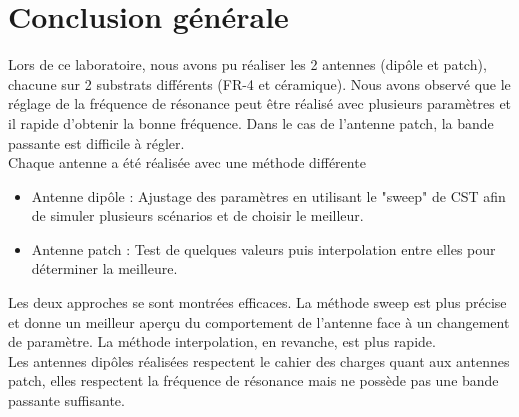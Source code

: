 \documentclass[Deriaz_Traiber_Labo02]{subfiles}
\begin{document}
\section{Conclusion générale}
Lors de ce laboratoire, nous avons pu réaliser les 2 antennes (dipôle et patch), chacune sur 2 substrats différents (FR-4 et céramique). Nous avons observé que le réglage de la fréquence de résonance peut être réalisé avec plusieurs paramètres et il rapide d'obtenir la bonne fréquence. Dans le cas de l'antenne patch, la bande passante est difficile à régler.\\
Chaque antenne a été réalisée avec une méthode différente
\begin{itemize}
\item Antenne dipôle : Ajustage des paramètres en utilisant le "sweep" de CST afin de simuler plusieurs scénarios et de choisir le meilleur.
\item Antenne patch : Test de quelques valeurs puis interpolation entre elles pour déterminer la meilleure.
\end{itemize}
Les deux approches se sont montrées efficaces. La méthode sweep est plus précise et donne un meilleur aperçu du comportement de l'antenne face à un changement de paramètre. La méthode interpolation, en revanche, est plus rapide.\\
Les antennes dipôles réalisées respectent le cahier des charges quant aux antennes patch, elles respectent la fréquence de résonance mais ne possède pas une bande passante suffisante.
\end{document}
